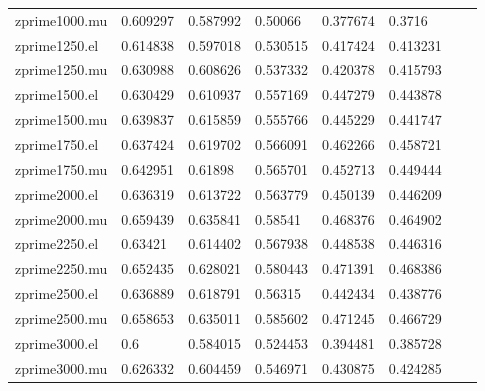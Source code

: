 \begin{table}[H]
\begin{tabular}{l|lllllll}
      zprime1000.mu & 0.609297   & 0.587992   & 0.50066    & 0.377674    & 0.3716      \\
      zprime1250.el & 0.614838   & 0.597018   & 0.530515   & 0.417424    & 0.413231    \\
      zprime1250.mu & 0.630988   & 0.608626   & 0.537332   & 0.420378    & 0.415793    \\
      zprime1500.el & 0.630429   & 0.610937   & 0.557169   & 0.447279    & 0.443878    \\
      zprime1500.mu & 0.639837   & 0.615859   & 0.555766   & 0.445229    & 0.441747    \\
      zprime1750.el & 0.637424   & 0.619702   & 0.566091   & 0.462266    & 0.458721    \\
      zprime1750.mu & 0.642951   & 0.61898    & 0.565701   & 0.452713    & 0.449444    \\
      zprime2000.el & 0.636319   & 0.613722   & 0.563779   & 0.450139    & 0.446209    \\
      zprime2000.mu & 0.659439   & 0.635841   & 0.58541    & 0.468376    & 0.464902    \\
      zprime2250.el & 0.63421    & 0.614402   & 0.567938   & 0.448538    & 0.446316    \\
      zprime2250.mu & 0.652435   & 0.628021   & 0.580443   & 0.471391    & 0.468386    \\
      zprime2500.el & 0.636889   & 0.618791   & 0.56315    & 0.442434    & 0.438776    \\
      zprime2500.mu & 0.658653   & 0.635011   & 0.585602   & 0.471245    & 0.466729    \\
      zprime3000.el & 0.6        & 0.584015   & 0.524453   & 0.394481    & 0.385728    \\
      zprime3000.mu & 0.626332   & 0.604459   & 0.546971   & 0.430875    & 0.424285    
    \end{tabular}
    \label{tab:eff_a}

  \end{table}



